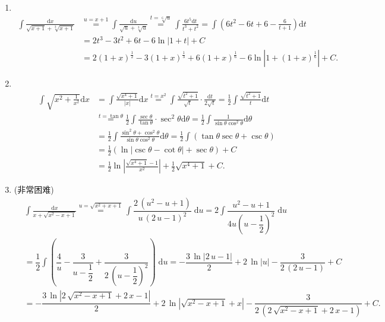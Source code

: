 \begin{solution}
\begin{enumerate}
    \item[42.]\\
    \[
    \begin{aligned}
    \int\frac{\mathrm{d}x}{\sqrt{x+1}+\sqrt[3]{x+1}}&\overset{u=x+1}{=}\int\frac{\mathrm{d}u}{\sqrt{u}+\sqrt[3]{u}}\overset{t=\sqrt[6]{u}}{=}\int\frac{6t^5\mathrm{d}t}{t^3+t^2}=\int\left(6t^2-6t+6-\frac{6}{t+1}\right)\mathrm{d}t\\
    &=2t^3-3t^2+6t-6\ln\left|1+t\right|+C\\
    &=2(1+x)^{\frac{1}{2}}-3(1+x)^{\frac{1}{3}}+6(1+x)^{\frac{1}{6}}-6\ln\left|1+(1+x)^{\frac{1}{6}}\right|+C.
    \end{aligned}
    \]

    \item[43.]\\
    \[
    \begin{aligned}
    \int\sqrt{x^2+\frac{1}{x^2}}\mathrm{d}x&=\int\frac{\sqrt{x^4+1}}{\left|x\right|}\mathrm{d}x\overset{t=x^2}{=}\int\frac{\sqrt{t^2+1}}{\sqrt{t}}\cdot\frac{\mathrm{d}t}{2\sqrt{t}}=\frac{1}{2}\int\frac{\sqrt{t^2+1}}{t}\mathrm{d}t\\
    &\overset{t=\tan\theta}{=}\frac{1}{2}\int\frac{\sec\theta}{\tan\theta}\cdot\sec^2\theta\mathrm{d}\theta=\frac{1}{2}\int\frac{1}{\sin\theta\cos^2\theta}\mathrm{d}\theta\\
    &=\frac{1}{2}\int\frac{\sin^2\theta+\cos^2\theta}{\sin\theta\cos^2\theta}\mathrm{d}\theta=\frac{1}{2}\int\left(\tan\theta\sec\theta+\csc\theta\right)\\
    &=\frac{1}{2}\left(\ln\left|\csc\theta-\cot\theta\right|+\sec\theta\right)+C\\
    &=\frac{1}{2}\ln\left|\frac{\sqrt{x^4+1}-1}{x^2}\right|+\frac{1}{2}\sqrt{x^4+1}+C.
    \end{aligned}
    \]

    \item[44.](非常困难)\\
    \[
    \begin{aligned}
    &\int\frac{\mathrm{d}x}{x+\sqrt{x^2-x+1}}\overset{u=\sqrt{x^2+x+1}}{=}\int{\dfrac{2\,\left({u}^{2}-u+1\right)}{u\,\left({2\,u-1}\right)^{2}}}{\;\mathrm{d}u}=2\int{\dfrac{{u}^{2}-u+1}{4u\left({u-\dfrac{1}{2}}\right)^{2}}}{\;\mathrm{d}u}\\
    &=\dfrac{1}{2}\int\left({\dfrac{4}{u}-\dfrac{3}{u-\dfrac{1}{2}}+\dfrac{3}{2\,\left({u-\dfrac{1}{2}}\right)^{2}}}\right){\;\mathrm{d}u}=-\dfrac{3\,\ln\left|2\,u-1\right|}{2}+2\,\ln\left|u\right|-\dfrac{3}{2\,\left(2\,u-1\right)}+C\\
    &=-\dfrac{3\,\ln\left|2\,\sqrt{{x}^{2}-x+1}+2\,x-1\right|}{2}+2\,\ln\left|\sqrt{{x}^{2}-x+1}+x\right|-\dfrac{3}{2\,\left(2\,\sqrt{{x}^{2}-x+1}+2\,x-1\right)}+C.
    \end{aligned}
    \]


\end{enumerate}
\end{solution}
